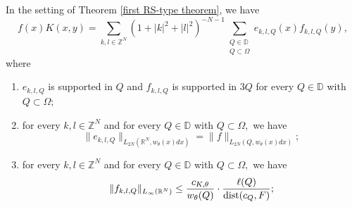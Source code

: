 \documentclass{amsart}
\begin{document}
\begin{lemma}\label{lem:Weyl-off-diagonal-kernel-NWO} In the setting of Theorem \ref{first RS-type theorem}, we have
$$f(x)K(x,y)=\sum_{k,l\in\mathbb{Z}^N}(1+|k|^2+|l|^2)^{-N-1}\sum_{\substack{Q\in\mathbb{D}\\ Q\subset\Omega}}e_{k,l,Q}(x)f_{k,l,Q}(y),$$
where
\begin{enumerate}[{\rm (i)}]
\item $e_{k,l,Q}$ is supported in $Q$ and $f_{k,l,Q}$ is supported in $3Q$ for every $Q\in\mathbb{D}$ with $Q\subset\Omega;$
\item for every $k,l\in\mathbb{Z}^N$ and for every $Q\in\mathbb{D}$ with $Q\subset\Omega,$ we have
$$\|e_{k,l,Q}\|_{L_{2N}(\mathbb{R}^N,w_{\theta}(x)dx)}=\|f\|_{L_{2N}(Q,w_{\theta}(x)dx)};$$
\item for every $k,l\in\mathbb{Z}^N$ and for every $Q\in\mathbb{D}$ with $Q\subset\Omega,$ we have
$$\|f_{k,l,Q}\|_{L_{\infty}(\mathbb{R}^N)}\leq \frac{c_{K,\theta}}{w_{\theta}(Q)}\cdot \frac{\ell(Q)}{{\rm dist}(c_Q,F)};$$
\end{enumerate}
\end{lemma}
\end{document}

